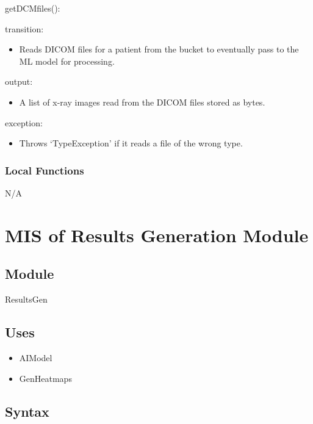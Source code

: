 \documentclass[12pt, titlepage]{article}
\begin{document}
\noindent getDCMfiles():
\begin{itemize}
  \begin{item}
    transition:
    \begin{itemize}
      \item Reads DICOM files for a patient from the bucket to eventually pass to the ML model for processing.
    \end{itemize}
  \end{item}
  \begin{item}
    output:
    \begin{itemize}
      \item A list of x-ray images read from the DICOM files stored as bytes.
    \end{itemize}
  \end{item}
  \begin{item}
    exception:
    \begin{itemize}
      \item Throws `TypeException' if it reads a file of the wrong type.
    \end{itemize}
  \end{item}
\end{itemize}

\subsubsection{Local Functions}
N/A

\newpage

\section{MIS of Results Generation Module} \label{mResGen} 

\subsection{Module}
ResultsGen

\subsection{Uses}
\begin{itemize}
    \item AIModel
    \item GenHeatmaps
\end{itemize}

\subsection{Syntax}
\end{document}
